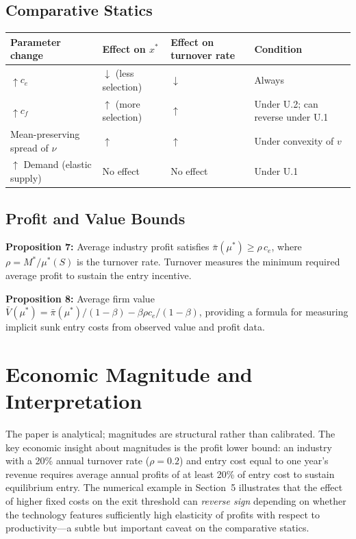 \subsection*{Comparative Statics}

\begin{center}
\small
\begin{tabular}{p{3.5cm}p{3.5cm}p{3.5cm}p{2.5cm}}
\toprule
\textbf{Parameter change} & \textbf{Effect on $x^*$} &
\textbf{Effect on turnover rate} & \textbf{Condition} \\
\midrule
$\uparrow c_e$ & $\downarrow$ (less selection) & $\downarrow$ & Always \\
$\uparrow c_f$ & $\uparrow$ (more selection) & $\uparrow$ &
  Under U.2; can reverse under U.1 \\
Mean-preserving spread of $\nu$ & $\uparrow$ & $\uparrow$ &
  Under convexity of $v$ \\
$\uparrow$ Demand (elastic supply) & No effect & No effect &
  Under U.1 \\
\bottomrule
\end{tabular}
\end{center}

\subsection*{Profit and Value Bounds}

\textbf{Proposition 7:} Average industry profit satisfies
$\bar{\pi}(\mu^*) \geq \rho\, c_e$, where $\rho = M^*/\mu^*(S)$ is the
turnover rate. Turnover measures the minimum required average profit to
sustain the entry incentive.

\textbf{Proposition 8:} Average firm value $\bar{V}(\mu^*)=\bar{\pi}(\mu^*)/(1-\beta)
- \beta\rho c_e/(1-\beta)$, providing a formula for measuring implicit sunk
entry costs from observed value and profit data.

\section{Economic Magnitude and Interpretation}

The paper is analytical; magnitudes are structural rather than calibrated. The
key economic insight about magnitudes is the profit lower bound: an industry
with a 20\% annual turnover rate ($\rho=0.2$) and entry cost equal to one
year's revenue requires average annual profits of at least 20\% of entry cost
to sustain equilibrium entry. The numerical example in Section~5 illustrates
that the effect of higher fixed costs on the exit threshold can \emph{reverse
sign} depending on whether the technology features sufficiently high elasticity
of profits with respect to productivity---a subtle but important caveat on the
comparative statics.

